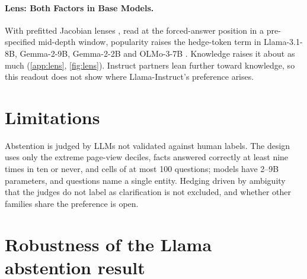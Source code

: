 \documentclass{article}
\begin{document}
\paragraph{Lens: Both Factors in Base Models.} With prefitted Jacobian lenses \citep{gurnee2026workspace}, read at the forced-answer position in a pre-specified mid-depth window, popularity raises the hedge-token term in Llama-3.1-8B, Gemma-2-9B, Gemma-2-2B and OLMo-3-7B \citep{olmo3}. Knowledge raises it about as much (\cref{app:lens}, \cref{fig:lens}). Instruct partners lean further toward knowledge, so this readout does not show where Llama-Instruct's preference arises.

\section{Limitations}

Abstention is judged by LLMs not validated against human labels. The design uses only the extreme page-view deciles, facts answered correctly at least nine times in ten or never, and cells of at most 100 questions; models have 2--9B parameters, and questions name a single entity. Hedging driven by ambiguity that the judges do not label as clarification is not excluded, and whether other families share the preference is open.




\appendix

\section{Robustness of the Llama abstention result}
\label{app:robust}
\end{document}
